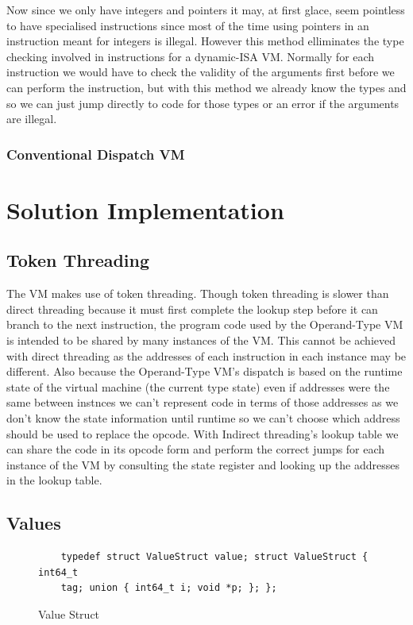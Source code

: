 \documentclass[english,a4paper]{report}
\begin{document}
Now since we only have integers and pointers it may, at first glace,
seem pointless to have specialised instructions since most of the time
using pointers in an instruction meant for integers is
illegal. However this method elliminates the type checking involved in
instructions for a dynamic-ISA VM. Normally for each instruction we
would have to check the validity of the arguments first before we can
perform the instruction, but with this method we already know the
types and so we can just jump directly to code for those types or an
error if the arguments are illegal.

\subsection{Conventional Dispatch VM}

\chapter{Solution Implementation}

\section{Token Threading}

The VM makes use of token threading. Though token threading is slower
than direct threading \cite{Shi2007} because it must first complete
the lookup step before it can branch to the next instruction, the
program code used by the Operand-Type VM is intended to be shared by
many instances of the VM. This cannot be achieved with direct
threading as the addresses of each instruction in each instance may be
different. Also because the Operand-Type VM's dispatch is based
on the runtime state of the virtual machine (the current type state)
even if addresses were the same between instnces we can't represent
code in terms of those addresses as we don't know the state
information until runtime so we can't choose which address should be
used to replace the opcode. With Indirect threading's lookup table we
can share the code in its opcode form and perform the correct jumps
for each instance of the VM by consulting the state register and
looking up the addresses in the lookup table.

\section{Values}

\begin{figure}
	\begin{lstlisting}
	typedef struct ValueStruct value; struct ValueStruct { int64_t
	tag; union { int64_t i; void *p; }; };
	\end{lstlisting}
	\label{fig:struct}
	\caption{Value Struct}
\end{figure}
\end{document}
